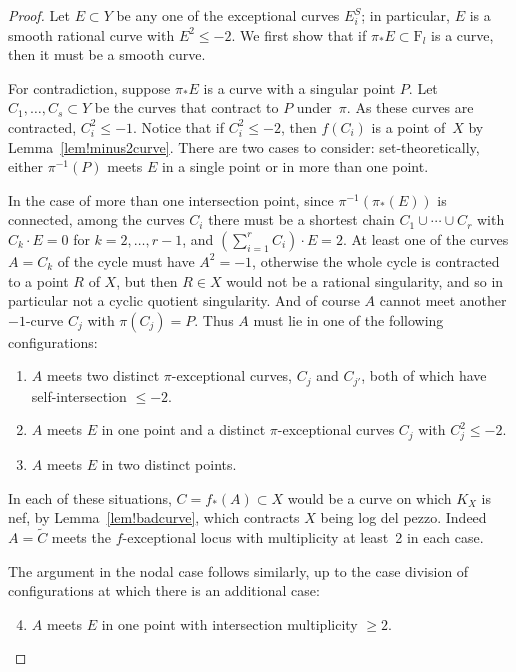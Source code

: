 \documentclass[11pt]{report}
\theoremstyle{definition}
\theoremstyle{definition}
\theoremstyle{definition}
\theoremstyle{definition}
\theoremstyle{definition}
\theoremstyle{definition}
\theoremstyle{definition}
\theoremstyle{definition}
\newcommand{\ldp}{log del pezzo}
\newcommand{\wt}[1]{\widetilde #1}
\newcommand{\F}{\mathrm{F}}
\begin{document}
\begin{proof}
Let $E\subset Y$ be any one of the exceptional curves $E_i^S$; in particular, $E$ is
a smooth rational curve with $E^2 \le-2$.
We first show that if $\pi_* E\subset\F_l$ is a curve, then it must be a smooth curve. 

For contradiction, suppose $\pi_*E$ is a curve with a singular point $P$.
Let $C_1,\dots,C_s\subset Y$ be the curves that contract to $P$ under~$\pi$.
As these curves are contracted, $C_i^2 \leq  -1$.
Notice that if $C_i^2\le-2$, then $f(C_i)$ is a point of~$X$
by Lemma~\ref{lem!minus2curve}.
There are two cases to consider: set-theoretically, either
$\pi^{-1}(P)$ meets $E$ in a single point or in more than one point.


In the case of more than one intersection point, since $\pi^{-1}(\pi_*(E))$ is connected,
among the curves $C_i$ there must be a shortest chain $C_1\cup\cdots\cup C_r$
with $C_k\cdot E=0$ for $k=2,\dots,r-1$, and $\left(\sum_{i=1}^r C_i\right)\cdot E = 2$.
At least one of the curves $A=C_k$ of the cycle must have $A^2=-1$, otherwise the
whole cycle is contracted to a point $R$ of $X$, but then $R\in X$ would not be
a rational singularity, and so in particular not a cyclic quotient singularity.
And of course $A$ cannot meet another $-1$-curve $C_j$ with $\pi(C_j)=P$.
Thus $A$ must lie in one of the following configurations:
\begin{enumerate}
\item
$A$ meets two distinct $\pi$-exceptional curves, $C_j$ and $C_{j'}$,
both of which have self-intersection $\le-2$.
\item
$A$ meets $E$ in one point and a distinct $\pi$-exceptional curves $C_j$
with $C_j^2\le-2$.
\item
$A$ meets $E$ in two distinct points.
\end{enumerate}
In each of these situations, $C = f_*(A)\subset X$ would be a curve
on which $K_X$ is nef, by Lemma~\ref{lem!badcurve}, which contracts
$X$ being \ldp. Indeed $A = \wt C$ meets the $f$-exceptional locus with multiplicity
at least~2 in each case.

The argument in the nodal case follows similarly, up to the case division of configurations
at which there is an additional case:
\begin{enumerate}
\setcounter{enumi}{3}
\item
$A$ meets $E$ in one point with intersection multiplicity $\ge2$.
\end{enumerate}



\end{proof}
\end{document}
